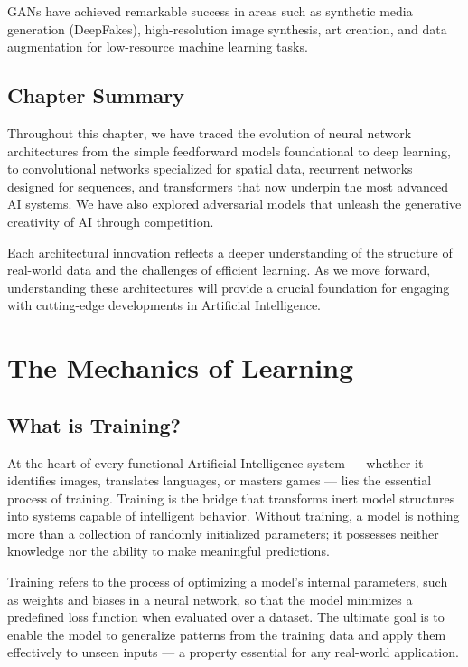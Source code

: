 \documentclass[openany]{book}
\begin{document}
GANs have achieved remarkable success in areas such as synthetic media 
generation (DeepFakes), high-resolution image synthesis, art creation, and data 
augmentation for low-resource machine learning tasks.

\section{Chapter Summary}

Throughout this chapter, we have traced the evolution of neural network 
architectures from the simple feedforward models foundational to deep learning, 
to convolutional networks specialized for spatial data, recurrent networks 
designed for sequences, and transformers that now underpin the most advanced AI 
systems. We have also explored adversarial models that unleash the generative 
creativity of AI through competition.

Each architectural innovation reflects a deeper understanding of the structure 
of real-world data and the challenges of efficient learning. As we move forward, 
understanding these architectures will provide a crucial foundation for engaging 
with cutting-edge developments in Artificial Intelligence.

\chapter{The Mechanics of Learning}

\section{What is Training?}

At the heart of every functional Artificial Intelligence system — whether it 
identifies images, translates languages, or masters games — lies the essential 
process of training. Training is the bridge that transforms inert model 
structures into systems capable of intelligent behavior. Without training, a 
model is nothing more than a collection of randomly initialized parameters; it 
possesses neither knowledge nor the ability to make meaningful predictions.

Training refers to the process of optimizing a model's internal parameters, such
as weights and biases in a neural network, so that the model minimizes a 
predefined loss function when evaluated over a dataset. The ultimate goal is to 
enable the model to generalize patterns from the training data and apply them 
effectively to unseen inputs — a property essential for any real-world 
application.
\end{document}
